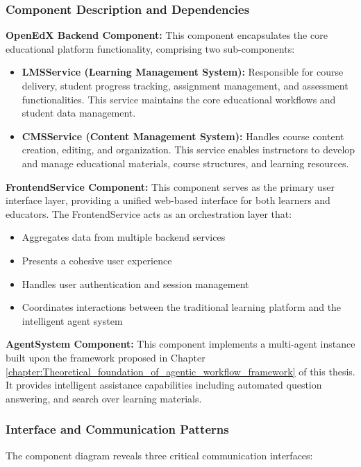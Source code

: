 \documentclass[../Main.tex]{subfiles}
\begin{document}
	\subsubsection{Component Description and Dependencies}
	\label{section:4.2.1.1_component_description_and_dependencies} \textbf{OpenEdX
	Backend Component:} This component encapsulates the core educational platform
	functionality, comprising two sub-components:
	\begin{itemize}
		\item \textbf{LMSService (Learning Management System):} Responsible for
			course delivery, student progress tracking, assignment management, and assessment
			functionalities. This service maintains the core educational workflows and
			student data management.

		\item \textbf{CMSService (Content Management System):} Handles course
			content creation, editing, and organization. This service enables instructors
			to develop and manage educational materials, course structures, and learning
			resources.
	\end{itemize}

	\textbf{FrontendService Component:} This component serves as the primary user
	interface layer, providing a unified web-based interface for both learners and
	educators. The FrontendService acts as an orchestration layer that:
	\begin{itemize}
		\item Aggregates data from multiple backend services

		\item Presents a cohesive user experience

		\item Handles user authentication and session management

		\item Coordinates interactions between the traditional learning platform and
			the intelligent agent system
	\end{itemize}

	\textbf{AgentSystem Component:} This component implements a multi-agent instance
	built upon the framework proposed in Chapter \ref{chapter:Theoretical_foundation_of_agentic_workflow_framework} of this
	thesis. It provides intelligent assistance capabilities including automated
	question answering, and search over learning materials.

	\subsubsection{Interface and Communication Patterns}
	\label{section:4.2.1.2_interface_and_communication_patterns} The component diagram
	reveals three critical communication interfaces:
\end{document}
